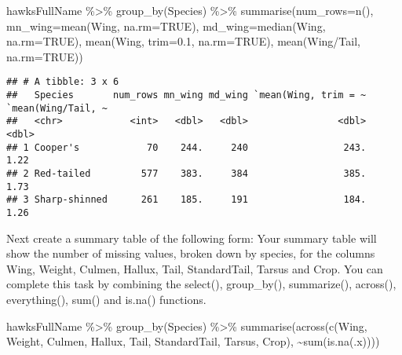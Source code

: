\documentclass[
]{article}
\newenvironment{Shaded}{\begin{snugshade}}{\end{snugshade}}
\newcommand{\AttributeTok}[1]{\textcolor[rgb]{0.77,0.63,0.00}{#1}}
\newcommand{\ConstantTok}[1]{\textcolor[rgb]{0.00,0.00,0.00}{#1}}
\newcommand{\FloatTok}[1]{\textcolor[rgb]{0.00,0.00,0.81}{#1}}
\newcommand{\FunctionTok}[1]{\textcolor[rgb]{0.00,0.00,0.00}{#1}}
\newcommand{\NormalTok}[1]{#1}
\newcommand{\SpecialCharTok}[1]{\textcolor[rgb]{0.00,0.00,0.00}{#1}}
\begin{document}
\begin{Shaded}
\begin{Highlighting}[]
\NormalTok{hawksFullName }\SpecialCharTok{\%\textgreater{}\%} \FunctionTok{group\_by}\NormalTok{(Species) }\SpecialCharTok{\%\textgreater{}\%} \FunctionTok{summarise}\NormalTok{(}\AttributeTok{num\_rows=}\FunctionTok{n}\NormalTok{(), }\AttributeTok{mn\_wing=}\FunctionTok{mean}\NormalTok{(Wing, }\AttributeTok{na.rm=}\ConstantTok{TRUE}\NormalTok{), }\AttributeTok{md\_wing=}\FunctionTok{median}\NormalTok{(Wing, }\AttributeTok{na.rm=}\ConstantTok{TRUE}\NormalTok{), }\FunctionTok{mean}\NormalTok{(Wing, }\AttributeTok{trim=}\FloatTok{0.1}\NormalTok{, }\AttributeTok{na.rm=}\ConstantTok{TRUE}\NormalTok{), }\FunctionTok{mean}\NormalTok{(Wing}\SpecialCharTok{/}\NormalTok{Tail, }\AttributeTok{na.rm=}\ConstantTok{TRUE}\NormalTok{))}
\end{Highlighting}
\end{Shaded}

\begin{verbatim}
## # A tibble: 3 x 6
##   Species       num_rows mn_wing md_wing `mean(Wing, trim = ~ `mean(Wing/Tail, ~
##   <chr>            <int>   <dbl>   <dbl>                <dbl>              <dbl>
## 1 Cooper's            70    244.     240                 243.               1.22
## 2 Red-tailed         577    383.     384                 385.               1.73
## 3 Sharp-shinned      261    185.     191                 184.               1.26
\end{verbatim}

Next create a summary table of the following form: Your summary table
will show the number of missing values, broken down by species, for the
columns Wing, Weight, Culmen, Hallux, Tail, StandardTail, Tarsus and
Crop. You can complete this task by combining the select(), group\_by(),
summarize(), across(), everything(), sum() and is.na() functions.

\begin{Shaded}
\begin{Highlighting}[]
\NormalTok{hawksFullName }\SpecialCharTok{\%\textgreater{}\%} \FunctionTok{group\_by}\NormalTok{(Species) }\SpecialCharTok{\%\textgreater{}\%} \FunctionTok{summarise}\NormalTok{(}\FunctionTok{across}\NormalTok{(}\FunctionTok{c}\NormalTok{(Wing, Weight, Culmen, Hallux, Tail, StandardTail, Tarsus, Crop), }\SpecialCharTok{\textasciitilde{}}\FunctionTok{sum}\NormalTok{(}\FunctionTok{is.na}\NormalTok{(.x))))}
\end{Highlighting}
\end{Shaded}
\end{document}
